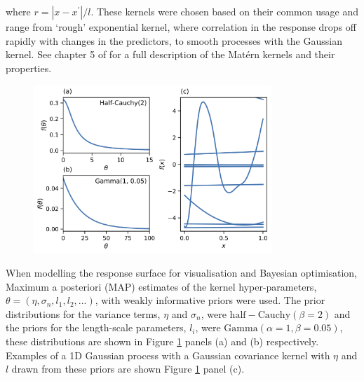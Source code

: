 where $r = |x-x^{\prime}|/l$. These kernels were chosen based on their common usage \cite{shahriariTakingHumanOut2016} and  range from `rough' exponential kernel, where correlation in the response drops off rapidly with changes in the predictors, to smooth processes with the Gaussian kernel. See chapter 5 of \cite{rasmussenGaussianProcessesMachine2006} for a full description of the Mat\'{e}rn kernels and their properties.  

\begin{figure}
    \centering
    \includegraphics[width=0.8\textwidth]{chapters/msm_optimization/figures/prior_functions.png}
    \label{fig:priors}
\end{figure}

When modelling the response surface for visualisation and Bayesian optimisation, Maximum a posteriori (MAP) estimates  of the kernel hyper-parameters, $\theta = (\eta, \sigma_{n}, l_{1}, l_{2}, ...)$, with weakly informative priors were used. The prior distributions for the variance terms, $\eta$ and $\sigma_{n}$, were $\mathrm{half-Cauchy}(\beta=2)$ and the priors for the length-scale parameters, $l_{i}$, were $\mathrm{Gamma}(\alpha=1, \beta=0.05)$, these distributions are shown in Figure \ref{fig:priors} panels (a) and (b) respectively.  Examples of a 1D Gaussian process with a Gaussian covariance kernel with $\eta$ and $l$ drawn from these priors are shown Figure \ref{fig:priors} panel (c).  

